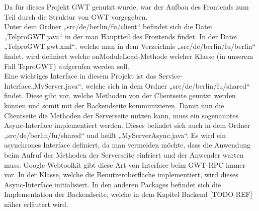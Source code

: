 \documentclass[12pt,a4paper,twoside]{article}
\begin{document}
Da für dieses Projekt GWT genutzt wurde, war der Aufbau des Frontends zum Teil durch die Struktur von GWT vorgegeben. \\
Unter dem Ordner „src/de/berlin/fu/client“ befindet sich die Datei „TelproGWT.java“ in der man Hauptteil des Frontends findet. In der Datei „TelproGWT.gwt.xml“, welche man in dem Verzeichnis „src/de/berlin/fu/berlin“ findet, wird definiert welche onModuleLoad-Methode welcher Klasse (in unserem Fall TeproGWT) aufgerufen werden soll. \\
Eine wichtiges Interface in diesem Projekt ist das Service-Interface„MyServer.java“, welche sich in dem Ordner „src/de/berlin/fu/shared“ findet. Diese gibt vor, welche Methoden von der Clientseite genutzt werden können und somit mit der Backendseite kommunizieren. Damit nun die Clientseite die Methoden der Serverseite nutzen kann, muss ein sogenanntes Async-Interface implementiert werden. Dieses befindet sich auch in dem Ordner „src/de/berlin/fu/shared“ und heißt „MyServerAsync.java“. Es wird ein asynchrones Interface definiert, da man vermeiden möchte, dass die Anwendung beim Aufruf der Methoden der Serverseite einfriert und der Anwender warten muss. Google Webtoolkit gibt diese Art von Interface beim GWT-RPC immer vor. In der Klasse, welche die Benutzeroberfläche implementiert, wird dieses Async-Interface initialisiert. 
In den anderen Packages befindet sich die Implementation der Backendseite, welche in dem Kapitel Backend [TODO REF] näher erläutert wird.
\end{document}
